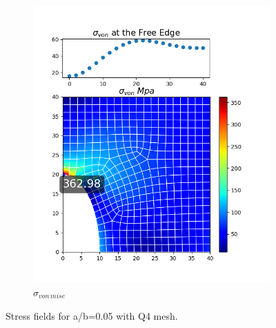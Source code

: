 \documentclass[twoside,twocolumn,10pt]{article}
\begin{document}
\begin{figure}[!ht]
\begin{subfigure}[c]{0.26\textwidth}
    \includegraphics[width=1.\linewidth]{Q2_5/Q5_0.5_von_quad.png}
    \caption{$\sigma_{von \, mise}$}
    \label{fig:von_quad_0.5}
  \end{subfigure}
  \caption{Stress fields for a/b=0.05 with Q4 mesh.}
  \label{fig:quad_0.5}
\end{figure}
\end{document}
